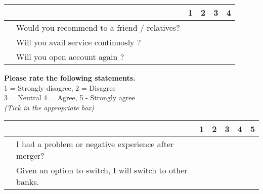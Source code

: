 \documentclass[10pt,a4paper]{article}
\newcounter{magicrownumbers}
\newcommand\rownumber{\stepcounter{magicrownumbers}\arabic{magicrownumbers}}
\newcommand \tab[1][1cm]{\hspace*{#1}}
\begin{document}
{\begin{minipage}{\textwidth}
\begin{tabularx}{\linewidth}{|l|l|X|X|X|X|}
\hline \multicolumn{2}{|c|}{} & 1 & 2 & 3 & 4\\
\hline \rownumber & Would you recommend to a friend / relatives? & \tab & \tab & \tab & \tab \\
\hline \rownumber & Will you avail service continuosly ?& \tab & \tab & \tab & \tab \\
\hline \rownumber & Will you open account again ? & \tab & \tab & \tab & \tab \\
\hline
\end{tabularx}

\end{minipage}

\textbf{Please rate the following statements.}\\
1 = Strongly disagree, 2 = Disagree \\
3 = Neutral
4 = Agree, 5 - Strongly agree\\
\emph {(Tick in the appropriate box)}\\
\begin{minipage}{\textwidth}

\begin{tabularx}{\linewidth}{|l|l|X|X|X|X|X|}
\hline \multicolumn{2}{|c|}{} & 1 & 2 & 3 & 4 & 5\\
\hline \rownumber & I had a problem or negative experience after merger? & \tab & \tab & \tab & \tab & \tab \\
\hline \rownumber & Given an option to switch, I will switch to other banks. & \tab & \tab & \tab & \tab & \tab \\
\hline
\end{tabularx}

\end{minipage}
}
\end{document}
